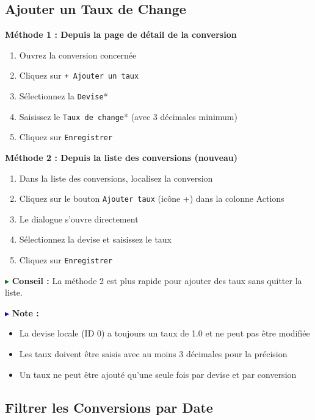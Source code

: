 \documentclass[12pt,a4paper]{report}
\begin{document}
\subsection{Ajouter un Taux de Change}

\textbf{Méthode 1 : Depuis la page de détail de la conversion}

\begin{enumerate}[leftmargin=*]
    \item Ouvrez la conversion concernée
    \item Cliquez sur \texttt{+ Ajouter un taux}
    \item Sélectionnez la \texttt{Devise}*
    \item Saisissez le \texttt{Taux de change}* (avec 3 décimales minimum)
    \item Cliquez sur \texttt{Enregistrer}
\end{enumerate}

\textbf{Méthode 2 : Depuis la liste des conversions (nouveau)}

\begin{enumerate}[leftmargin=*]
    \item Dans la liste des conversions, localisez la conversion
    \item Cliquez sur le bouton \texttt{Ajouter taux} (icône +) dans la colonne Actions
    \item Le dialogue s'ouvre directement
    \item Sélectionnez la devise et saisissez le taux
    \item Cliquez sur \texttt{Enregistrer}
\end{enumerate}

\textcolor{green}{$\blacktriangleright$} \textbf{Conseil :} La méthode 2 est plus rapide pour ajouter des taux sans quitter la liste.

\textcolor{blue}{$\blacktriangleright$} \textbf{Note :} 
\begin{itemize}[leftmargin=*]
    \item La devise locale (ID 0) a toujours un taux de 1.0 et ne peut pas être modifiée
    \item Les taux doivent être saisis avec au moins 3 décimales pour la précision
    \item Un taux ne peut être ajouté qu'une seule fois par devise et par conversion
\end{itemize}

\subsection{Filtrer les Conversions par Date}
\end{document}
